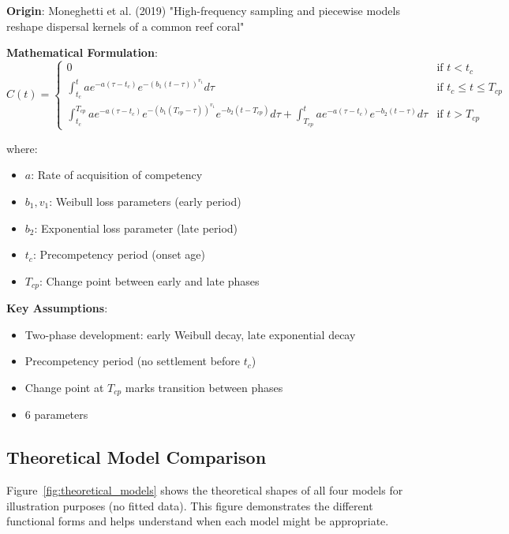 \documentclass[11pt]{article}
\begin{document}
\textbf{Origin}: Moneghetti et al. (2019) "High-frequency sampling and piecewise models reshape dispersal kernels of a common reef coral"

\textbf{Mathematical Formulation}:
\begin{equation}
C(t) = \begin{cases}
0 & \text{if } t < t_c \\
\int_{t_c}^{t} a e^{-a(\tau - t_c)} e^{-(b_1(t - \tau))^{v_1}} d\tau & \text{if } t_c \leq t \leq T_{cp} \\
\int_{t_c}^{T_{cp}} a e^{-a(\tau - t_c)} e^{-(b_1(T_{cp} - \tau))^{v_1}} e^{-b_2(t - T_{cp})} d\tau + \int_{T_{cp}}^{t} a e^{-a(\tau - t_c)} e^{-b_2(t - \tau)} d\tau & \text{if } t > T_{cp}
\end{cases}
\end{equation}

where:
\begin{itemize}
    \item $a$: Rate of acquisition of competency
    \item $b_1, v_1$: Weibull loss parameters (early period)
    \item $b_2$: Exponential loss parameter (late period)
    \item $t_c$: Precompetency period (onset age)
    \item $T_{cp}$: Change point between early and late phases
\end{itemize}

\textbf{Key Assumptions}:
\begin{itemize}
    \item Two-phase development: early Weibull decay, late exponential decay
    \item Precompetency period (no settlement before $t_c$)
    \item Change point at $T_{cp}$ marks transition between phases
    \item 6 parameters
\end{itemize}

\subsection{Theoretical Model Comparison}

Figure~\ref{fig:theoretical_models} shows the theoretical shapes of all four models for illustration purposes (no fitted data). This figure demonstrates the different functional forms and helps understand when each model might be appropriate.
\end{document}
